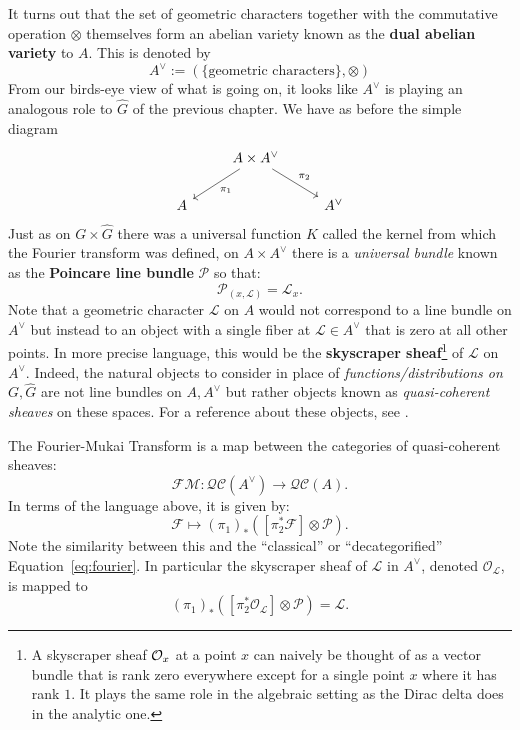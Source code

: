 It turns out that the set of geometric characters together with the commutative operation $\otimes$ themselves form an abelian variety known as the \textbf{dual abelian variety} to $A$. This is denoted by
\[
	A^\vee := (\{\text{geometric characters}\}, \otimes)
\]
From our birds-eye view of what is going on, it looks like $A^\vee$ is playing an analogous role to $\hat G$ of the previous chapter. We have as before the simple diagram
\[
	\begin{tikzcd}
		& A \times A^\vee \arrow[ld,"\pi_1"] \arrow[rd,"\pi_2"]&\\
		A & & A^\vee
	\end{tikzcd}
\]
Just as on $G \times \hat G$ there was a universal function $K$ called the kernel from which the Fourier transform was defined, on $A \times A^\vee$ there is a \emph{universal bundle} known as the \textbf{Poincare line bundle} $\mathcal P$ so that:
\[
	\mathcal P_{(x, \mathcal L)} = \mathcal L_x.
\]
Note that a geometric character $\mathcal L$ on $A$ would not correspond to a line bundle on $A^\vee$ but instead to an object with a single fiber at $\mathcal L \in A^\vee$ that is zero at all other points. In more precise language, this would be the \textbf{skyscraper sheaf}\footnote{A skyscraper sheaf $\mathcal{O}_x$ at a point $x$ can naively be thought of as a vector bundle that is rank zero everywhere except for a single point $x$ where it has rank $1$. It plays the same role in the algebraic setting as the Dirac delta does in the analytic one.} of $\mathcal L$ on $A^\vee$. Indeed, the natural objects to consider in place of \emph{functions/distributions on $G, \hat G$} are not line bundles on $A, A^\vee$ but rather objects known as \emph{quasi-coherent sheaves} on these spaces. For a reference about these objects, see \cite{hartshorne1977}.
\begin{concept}
	The Fourier-Mukai Transform is a map between the categories of quasi-coherent sheaves:
	\[
		\mathcal{FM}: \mathcal{QC}(A^\vee) \to \mathcal{QC}(A).
	\]
	In terms of the language above, it is given by:
	\[
		\mathcal F \mapsto (\pi_1)_* ([\pi_2^* \mathcal F] \otimes \mathcal P) .
	\]
	Note the similarity between this and the ``classical'' or ``decategorified'' Equation~\eqref{eq:fourier}. 
	In particular the skyscraper sheaf of $\mathcal L$ in $A^\vee$, denoted $\mathcal O_{\mathcal L}$, is mapped to 
	\[
		(\pi_1)_* ([\pi_2^* \mathcal O_{\mathcal L}] \otimes \mathcal P) = \mathcal L.
	\]
\end{concept}


